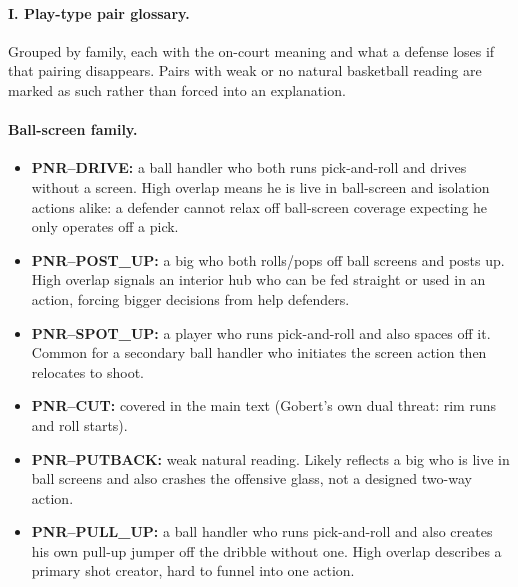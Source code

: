\documentclass[11pt]{article}
\begin{document}
\paragraph{I. Play-type pair glossary.}
\label{sec:appendix-pair-glossary}
Grouped by family, each with the on-court meaning and what a defense loses if that pairing
disappears. Pairs with weak or no natural basketball reading are marked as such rather than
forced into an explanation.

\paragraph*{Ball-screen family.}
\begin{itemize}[leftmargin=1.4em,itemsep=0.2em]
 \item \textbf{PNR--DRIVE:} a ball handler who both runs pick-and-roll and drives without a
 screen. High overlap means he is live in ball-screen and isolation actions alike: a
 defender cannot relax off ball-screen coverage expecting he only operates off a pick.
 \item \textbf{PNR--POST\_UP:} a big who both rolls/pops off ball screens and posts up. High
 overlap signals an interior hub who can be fed straight or used in an action, forcing bigger
 decisions from help defenders.
 \item \textbf{PNR--SPOT\_UP:} a player who runs pick-and-roll and also spaces off it. Common
 for a secondary ball handler who initiates the screen action then relocates to shoot.
 \item \textbf{PNR--CUT:} covered in the main text (Gobert's own dual threat: rim runs and
 roll starts).
 \item \textbf{PNR--PUTBACK:} weak natural reading. Likely reflects a big who is live in ball
 screens and also crashes the offensive glass, not a designed two-way action.
 \item \textbf{PNR--PULL\_UP:} a ball handler who runs pick-and-roll and also creates his own
 pull-up jumper off the dribble without one. High overlap describes a primary shot creator,
 hard to funnel into one action.
\end{itemize}
\end{document}
